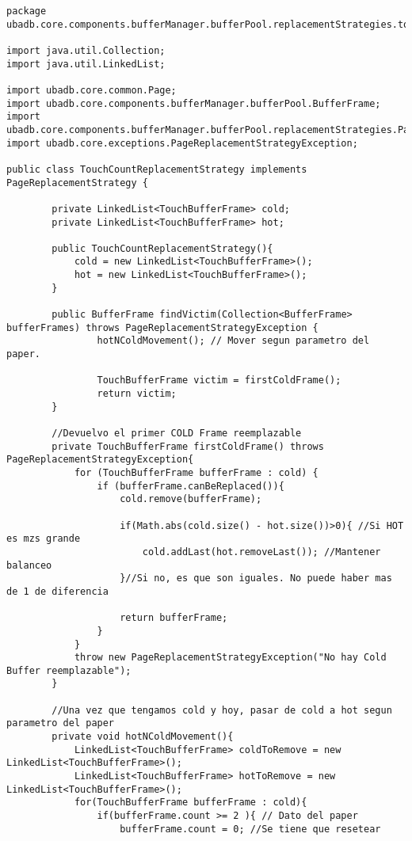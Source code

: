\begin{lstlisting}
package ubadb.core.components.bufferManager.bufferPool.replacementStrategies.touchcount;

import java.util.Collection;
import java.util.LinkedList;

import ubadb.core.common.Page;
import ubadb.core.components.bufferManager.bufferPool.BufferFrame;
import ubadb.core.components.bufferManager.bufferPool.replacementStrategies.PageReplacementStrategy;
import ubadb.core.exceptions.PageReplacementStrategyException;

public class TouchCountReplacementStrategy implements PageReplacementStrategy {

		private LinkedList<TouchBufferFrame> cold;
		private LinkedList<TouchBufferFrame> hot;
		
		public TouchCountReplacementStrategy(){
			cold = new LinkedList<TouchBufferFrame>();
			hot = new LinkedList<TouchBufferFrame>();
		}
		
        public BufferFrame findVictim(Collection<BufferFrame> bufferFrames) throws PageReplacementStrategyException {
        		hotNColdMovement(); // Mover segun parametro del paper.
        		
        		TouchBufferFrame victim = firstColdFrame();
                return victim;
        }
        
        //Devuelvo el primer COLD Frame reemplazable
        private TouchBufferFrame firstColdFrame() throws PageReplacementStrategyException{
        	for (TouchBufferFrame bufferFrame : cold) {
        		if (bufferFrame.canBeReplaced()){
        			cold.remove(bufferFrame);
        			
        			if(Math.abs(cold.size() - hot.size())>0){ //Si HOT es mzs grande
        				cold.addLast(hot.removeLast()); //Mantener balanceo
        			}//Si no, es que son iguales. No puede haber mas de 1 de diferencia
        			
        			return bufferFrame;
        		}
        	}
        	throw new PageReplacementStrategyException("No hay Cold Buffer reemplazable");
        }
        
        //Una vez que tengamos cold y hoy, pasar de cold a hot segun parametro del paper
        private void hotNColdMovement(){
			LinkedList<TouchBufferFrame> coldToRemove = new LinkedList<TouchBufferFrame>();
			LinkedList<TouchBufferFrame> hotToRemove = new LinkedList<TouchBufferFrame>();
        	for(TouchBufferFrame bufferFrame : cold){
        		if(bufferFrame.count >= 2 ){ // Dato del paper
        			bufferFrame.count = 0; //Se tiene que resetear
        			

\end{lstlisting}

